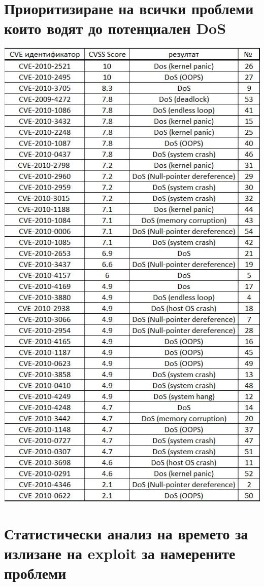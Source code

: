 \documentclass[a4paper,12pt,leqno]{article}
\begin{document}
\section{Приоритизиране на всички проблеми които водят до потенциален DoS}
\includegraphics{table}

\section{Статистически анализ на времето за излизане на exploit за намерените проблеми}
\end{document}
